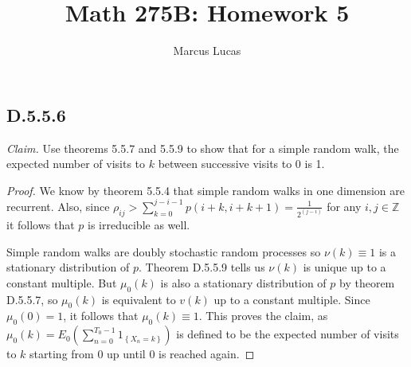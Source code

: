 \documentclass[10pt]{article}
\title{Math 275B: Homework 5}
\author{Marcus Lucas}
\date{\vspace{-1cm}}
\begin{document}
\maketitle

\subsection*{D.5.5.6}
\textit{Claim.} 
Use theorems 5.5.7 and 5.5.9 to show that for a simple random walk,
the expected number of visits to $k$ between successive visits to
0 is 1.

\begin{proof}
 We know by theorem 5.5.4 that simple random walks in one
 dimension are recurrent. Also, since 
 $\rho_{ij} > \sum_{k=0}^{j-i-1}p(i+k,i+k+1) = \frac{1}{2^{(j-i)}}$
 for any ${i,j} \in \mathbb{Z}$ it follows that $p$ is 
 irreducible as well.

 Simple random walks are doubly stochastic random processes
 so $\nu(k) \equiv 1$ is a stationary distribution of $p$.
 Theorem D.5.5.9 tells us $\nu(k)$ is unique up to a constant
 multiple. But $\mu_0(k)$ is also a stationary distribution
 of $p$ by theorem D.5.5.7, so $\mu_0(k)$ is equivalent to $v(k)$
 up to a constant multiple. Since $\mu_0(0) = 1$, it follows
 that $\mu_0(k) \equiv 1$. This proves the claim,
 as $\mu_0(k) = E_0 \left( \sum_{n=0}^{T_0-1}1_{\left\{X_n 
 = k\right\}} \right)$ is defined to be the expected number of visits
 to $k$ starting from $0$ up until $0$ is reached again.
\end{proof}
\end{document}
